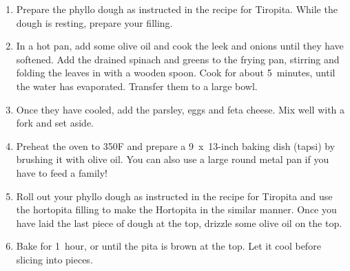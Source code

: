 \begin{enumerate}
    \item Prepare the phyllo dough as instructed in the recipe for Tiropita. While the dough is resting, prepare your filling.
    \item In a hot pan, add some olive oil and cook the leek and onions until they have softened. Add the drained spinach and greens to the frying pan, stirring and folding the leaves in with a wooden spoon. Cook for about 5~minutes, until the water has evaporated. Transfer them to a large bowl.
    \item Once they have cooled, add the parsley, eggs and feta cheese. Mix well with a fork and set aside.
    \item Preheat the oven to 350\degree F and prepare a 9~x~13-inch baking dish (tapsi) by brushing it with olive oil. You can also use a large round metal pan if you have to feed a family!
    \item Roll out your phyllo dough as instructed in the recipe for Tiropita and use the hortopita filling to make the Hortopita in the similar manner. Once you have laid the last piece of dough at the top, drizzle some olive oil on the top.
    \item Bake for 1~hour, or until the pita is brown at the top. Let it cool before slicing into pieces.
\end{enumerate}

